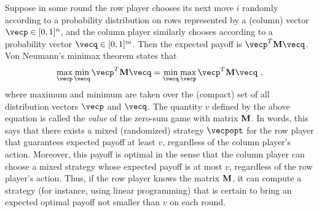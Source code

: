 \documentclass[12pt]{article}
\newcommand{\mat}{{\bf M}}
\begin{document}
Suppose in some round the row player chooses its next move $i$ randomly
according to a probability distribution on rows represented by a (column)
vector $\vecp \in [0,1]^n$, and the column player similarly chooses according
to a probability vector $\vecq\in [0,1]^m$. Then the expected payoff is
$\vecp^T \mat \vecq$. Von Neumann's minimax theorem states that
\[
    \max_{\vecp} \min_{\vecq} \vecp^T \mat \vecq
=
    \min_{\vecq} \max_{\vecp} \vecp^T \mat \vecq~,
\]
where maximum and minimum are taken over the (compact) set of all distribution
vectors $\vecp$ and $\vecq$.
The quantity $v$ defined by the above equation is called the {\em value\/} of
the zero-sum game with matrix $\mat$. In words, this says that
there exists a mixed (randomized) strategy $\vecpopt$ for the row player that
guarantees expected payoff at least $v$, regardless of the column player's
action. Moreover, this payoff is optimal in the sense that the column player
can choose a mixed strategy whose expected payoff is at most $v$, regardless
of the row player's action.
Thus, if the row player knows the matrix $\mat$, it can compute a strategy (for
instance, using linear programming) that is certain to bring an expected
optimal payoff not smaller than $v$ on each round.
\end{document}
